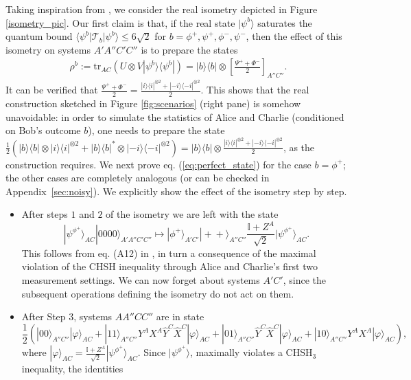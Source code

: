 \documentclass[onecolumn,prx,amsmath,amssymb]{revtex4-2}
\def\bra#1{\langle#1|} \def\ket#1{|#1\rangle}
\def\ketbra#1#2{\ket{#1}\!\bra{#2}}
\def\proj#1{\ket{#1}\!\bra{#1}}
\def\id{{\mathbb I}}
\def\tr{\mbox{tr}}
\begin{document}
\begin{appendix}
Taking inspiration from \cite{self_testing}, we consider the real isometry depicted in Figure \ref{isometry_pic}. Our first claim is that, if the real state $\ket{\psi^b}$ saturates the quantum bound $\bra{\psi^b}\mathscr{T}_b\ket{\psi^b}\leq 6\sqrt{2}$ for $b=\phi^+,\psi^+,\phi^-,\psi^-$, then the effect of this isometry on systems $A'A''C'C''$ is to prepare the states 
\begin{align} \label{eq:perfect_state}
\rho^b:= \tr_{AC}({U}\otimes {V} \ketbra{\psi^b}{\psi^b})=\ketbra{b}{b}\otimes\left[\frac{\Psi^++\Phi^-}{2}\right]_{A''C''}.
\end{align}
It can be verified that $\frac{\Psi^+ +\Phi^-}{2}=\frac{\proj{i}^{\otimes 2}+\proj{-i}^{\otimes 2}}{2}$. This shows that the real construction sketched in Figure \ref{fig:scenarios} (right pane) is somehow unavoidable: in order to simulate the statistics of Alice and Charlie (conditioned on Bob's outcome $b$), one needs to prepare the state $\frac{1}{2}(\proj{b}\otimes \proj{i}^{\otimes 2}+\proj{b}^*\otimes \proj{-i}^{\otimes 2})=\proj{b}\otimes \frac{\proj{i}^{\otimes 2}+\proj{-i}^{\otimes 2}}{2}$, as the construction requires.
We next prove eq. (\ref{eq:perfect_state}) for the case $b= \phi^+$; the other cases are completely analogous (or can be checked in Appendix~\ref{sec:noisy}). We explicitly show the effect of the isometry step by step. 
\begin{itemize}
\item After steps $1$ and $2$ of the isometry we are left with the state
\[
\ket{\psi^{\phi^+}}_{AC} \ket{0000}_{A'A''C'C''} \mapsto \ket{\phi^+}_{A'C'} \ket{+\!+}_{A''C''} \frac{\id + Z^A}{\sqrt{2}} \ket{\psi^{\phi^+}}_{{AC}}. 
\]
This follows from eq. (A12) in \cite{self_testing}, in turn a consequence of the maximal violation of the CHSH inequality through Alice and Charlie's first two measurement settings. We can now forget about systems $A'C'$, since the subsequent operations defining the isometry do not act on them. 

\item After Step $3$, systems ${A}A''{C}C''$ are in state
\begin{equation} \label{eq: middle state}
\frac{1}{2}(\ket{00}_{A''C''} \ket{\varphi}_{{AC}} + \ket{11}_{A''C''} Y^AX^A\hat{Y}^C \hat{X}^C \ket{\varphi}_{{AC}} + \ket{01}_{A''C''} \hat{Y}^C \hat{X}^C \ket{\varphi}_{{AC}}+\ket{10}_{A''C''} Y^AX^A \ket{\varphi}_{{AC}}),
\end{equation}
where $\ket{\varphi}_{{AC}}= \frac{\id+Z^A}{\sqrt{2}}\ket{\psi^{\phi^+}}_{{AC}}$. 
Since $\ket{\psi^{\phi^+}}$, maximally violates a $\text{CHSH}_3$ inequality, the identities 


\end{itemize}
\end{appendix}
\end{document}

